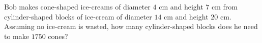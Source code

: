 Bob makes cone-shaped ice-creams of diameter $4$ cm and height $7$ cm from cylinder-shaped blocks of ice-cream of diameter $14$ cm and height $20$ cm. Assuming no ice-cream is wasted, how many cylinder-shaped blocks does he need to make $1750$ cones?
